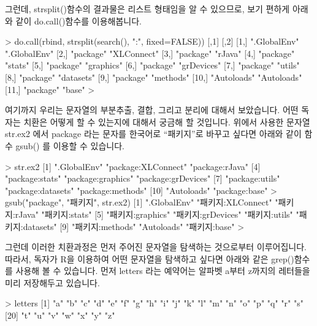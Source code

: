 \documentclass[tutorial.tex]{subfiles}
\begin{document}
그런데, strsplit()함수의 결과물은 리스트 형태임을 알 수 있으므로, 보기 편하게 아래와 같이 do.call()함수를 이용해봅니다. 

\begin{Schunk}
\begin{Soutput} 
> do.call(rbind, strsplit(search(), ":", fixed=FALSE))
      [,1]         [,2]        
 [1,] ".GlobalEnv" ".GlobalEnv"
 [2,] "package"    "XLConnect" 
 [3,] "package"    "rJava"     
 [4,] "package"    "stats"     
 [5,] "package"    "graphics"  
 [6,] "package"    "grDevices" 
 [7,] "package"    "utils"     
 [8,] "package"    "datasets"  
 [9,] "package"    "methods"   
[10,] "Autoloads"  "Autoloads" 
[11,] "package"    "base"      
> 
\end{Soutput}
\end{Schunk}

여기까지 우리는 문자열의 부분추출, 결합, 그리고 분리에 대해서 보았습니다.
어떤 독자는 치환은 어떻게 할 수 있는지에 대해서 궁금해 할 것입니다.
위에서 사용한 문자열 str.ex2 에서 package 라는 문자를 한국어로 ``패키지''로 바꾸고 싶다면 아래와 같이 함수 gsub() 를 이용할 수 있습니다. 

\begin{Schunk}
\begin{Soutput} 
> str.ex2
 [1] ".GlobalEnv"        "package:XLConnect" "package:rJava"    
 [4] "package:stats"     "package:graphics"  "package:grDevices"
 [7] "package:utils"     "package:datasets"  "package:methods"  
[10] "Autoloads"         "package:base"     
> gsub("package", "패키지", str.ex2)
 [1] ".GlobalEnv"       "패키지:XLConnect" "패키지:rJava"     "패키지:stats"    
 [5] "패키지:graphics"  "패키지:grDevices" "패키지:utils"     "패키지:datasets" 
 [9] "패키지:methods"   "Autoloads"        "패키지:base"     
> 
\end{Soutput}
\end{Schunk}

그런데 이러한 치환과정은 먼저 주어진 문자열을 탐색하는 것으로부터 이루어집니다.
따라서, 독자가 R을 이용하여 어떤 문자열을 탐색하고 싶다면 아래와 같은 grep()함수를 사용해 볼 수 있습니다. 
먼저 letters 라는 예약어는 알파벳 a부터 z까지의 레터들을 미리 저장해두고 있습니다. 

\begin{Schunk}
\begin{Soutput} 
> letters
 [1] "a" "b" "c" "d" "e" "f" "g" "h" "i" "j" "k" "l" "m" "n" "o" "p" "q" "r" "s"
[20] "t" "u" "v" "w" "x" "y" "z"
\end{Soutput}
\end{Schunk}
\end{document}
